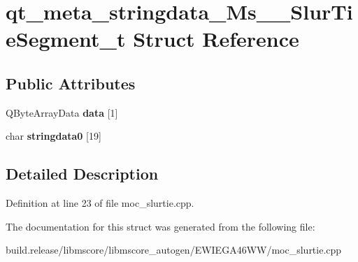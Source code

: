 \hypertarget{structqt__meta__stringdata___ms_____slur_tie_segment__t}{}\section{qt\+\_\+meta\+\_\+stringdata\+\_\+\+Ms\+\_\+\+\_\+\+Slur\+Tie\+Segment\+\_\+t Struct Reference}
\label{structqt__meta__stringdata___ms_____slur_tie_segment__t}
\subsection*{Public Attributes}
\begin{DoxyCompactItemize}
\item 
\mbox{\label{structqt__meta__stringdata___ms_____slur_tie_segment__t_a4855611c3c1783abe1f2a3aa34a8bffb}} 
Q\+Byte\+Array\+Data {\bfseries data} \mbox{[}1\mbox{]}
\item 
\mbox{\label{structqt__meta__stringdata___ms_____slur_tie_segment__t_a5982796876df38403fadd5158d2156eb}} 
char {\bfseries stringdata0} \mbox{[}19\mbox{]}
\end{DoxyCompactItemize}


\subsection{Detailed Description}


Definition at line 23 of file moc\+\_\+slurtie.\+cpp.



The documentation for this struct was generated from the following file\+:\begin{DoxyCompactItemize}
\item 
build.\+release/libmscore/libmscore\+\_\+autogen/\+E\+W\+I\+E\+G\+A46\+W\+W/moc\+\_\+slurtie.\+cpp\end{DoxyCompactItemize}
